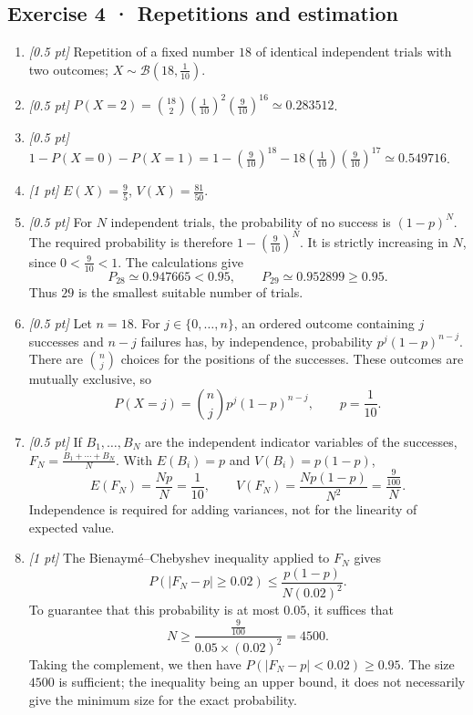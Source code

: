 \subsection*{Exercise 4 · Repetitions and estimation}\begin{enumerate}

\item \textit{[0.5 pt]} Repetition of a fixed number $18$ of identical independent trials with two outcomes; $X\sim\mathcal B(18,\frac{1}{10})$.

\item \textit{[0.5 pt]} $P(X=2)=\binom{18}2(\frac{1}{10})^2(\frac{9}{10})^{16}\simeq0.283512$.

\item \textit{[0.5 pt]} $1-P(X=0)-P(X=1)=1-(\frac{9}{10})^{18}-18(\frac{1}{10})(\frac{9}{10})^{17}\simeq0.549716$.

\item \textit{[1 pt]} $E(X)=\frac{9}{5}$, $V(X)=\frac{81}{50}$.

\item \textit{[0.5 pt]} For $N$ independent trials, the probability of no success is $(1-p)^N$. The required probability is therefore $1-(\frac{9}{10})^N$. It is strictly increasing in $N$, since $0<\frac{9}{10}<1$. The calculations give
\[P_{28}\simeq0.947665<0.95,\qquad P_{29}\simeq0.952899\ge0.95.\]
Thus $29$ is the smallest suitable number of trials.

\item \textit{[0.5 pt]} Let $n=18$. For $j\in\{0,\ldots,n\}$, an ordered outcome containing $j$ successes and $n-j$ failures has, by independence, probability $p^j(1-p)^{n-j}$. There are $\binom nj$ choices for the positions of the successes. These outcomes are mutually exclusive, so
\[P(X=j)=\binom nj p^j(1-p)^{n-j},\qquad p=\frac{1}{10}.\]

\item \textit{[0.5 pt]} If $B_1,\ldots,B_N$ are the independent indicator variables of the successes, $F_N=\frac{B_1+\cdots+B_N}{N}$. With $E(B_i)=p$ and $V(B_i)=p(1-p)$,
\[E(F_N)=\frac{Np}{N}=\frac{1}{10},\qquad V(F_N)=\frac{Np(1-p)}{N^2}=\frac{\frac{9}{100}}{N}.\]
Independence is required for adding variances, not for the linearity of expected value.

\item \textit{[1 pt]} The Bienaymé–Chebyshev inequality applied to $F_N$ gives
\[P(|F_N-p|\ge0.02)\le\frac{p(1-p)}{N(0.02)^2}.\]
To guarantee that this probability is at most $0.05$, it suffices that
\[N\ge\frac{\frac{9}{100}}{0.05\times(0.02)^2}=4500.\]
Taking the complement, we then have $P(|F_N-p|<0.02)\ge0.95$. The size $4500$ is sufficient; the inequality being an upper bound, it does not necessarily give the minimum size for the exact probability.

\end{enumerate}

